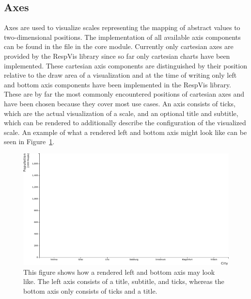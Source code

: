 \subsection{Axes}



Axes are used to visualize scales representing the mapping of abstract values to two-dimensional positions.
The implementation of all available axis components can be found in the  file in the core module.
Currently only cartesian axes are provided by the RespVis library since so far only cartesian charts have been implemented.
These cartesian axis components are distinguished by their position relative to the draw area of a visualization and at the time of writing only left and bottom axis components have been implemented in the RespVis library.
These are by far the most commonly encountered positions of cartesian axes and have been chosen because they cover most use cases. 
An axis consists of ticks, which are the actual visualization of a scale, and an optional title and subtitle, which can be rendered to additionally describe the configuration of the visualized scale. 
An example of what a rendered left and bottom axis might look like can be seen in Figure~\ref{fig:Axes}. 

\begin{figure}[tp]
\centering
\includegraphics[keepaspectratio,width=\linewidth,height=\fullh]{diagrams/axes.pdf}
\caption[RespVis Axis Components]{
  This figure shows how a rendered left and bottom axis may look like.
  The left axis consists of a title, subtitle, and ticks, whereas the bottom axis only consists of ticks and a title. 
}
\label{fig:Axes}
\end{figure}
  

